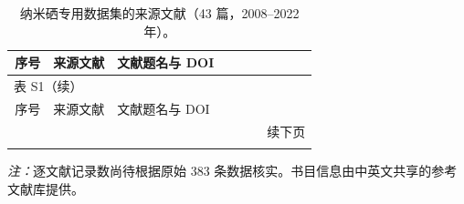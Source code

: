 \small
\setlength{\tabcolsep}{3.5pt}
\setlength{\LTleft}{0pt}
\setlength{\LTright}{0pt}
\renewcommand{\arraystretch}{1.12}
\begin{longtable}{r >{\raggedright\arraybackslash}p{0.21\linewidth} >{\raggedright\arraybackslash}p{0.66\linewidth}}
\caption{纳米硒专用数据集的来源文献（43 篇，2008--2022 年）。}\label{tab:source-publications}\\
\toprule
序号 & 来源文献 & 文献题名与 DOI \\
\midrule
\endfirsthead
\multicolumn{3}{l}{表 S1（续）} \\
\toprule
序号 & 来源文献 & 文献题名与 DOI \\
\midrule
\endhead
\midrule
\multicolumn{3}{r}{续下页} \\
\endfoot
\bottomrule
\endlastfoot

\end{longtable}
\noindent \textit{注：}逐文献记录数尚待根据原始 383 条数据核实。书目信息由中英文共享的参考文献库提供。
